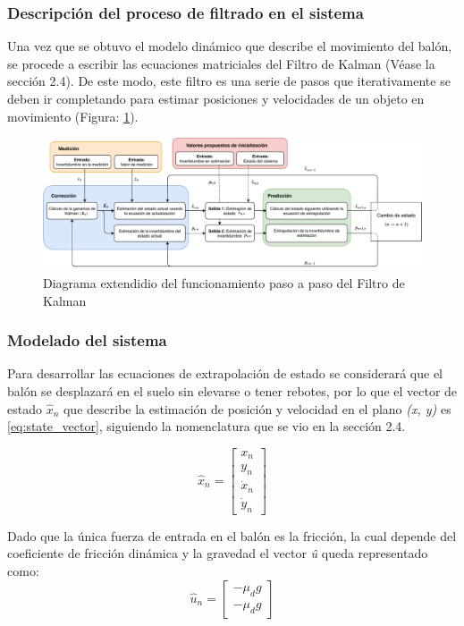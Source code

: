 		\subsubsection*{Descripción del proceso de filtrado en el sistema}
Una vez que se obtuvo el modelo dinámico que describe el movimiento del balón, se procede a escribir las ecuaciones matriciales del Filtro de Kalman (Véase la sección 2.4). De este modo, este filtro es una serie de pasos que iterativamente se deben ir completando para estimar posiciones y velocidades de un objeto en movimiento (Figura: \ref{fig:kalman_extended_diagram}).

\begin{figure}
\centering
\includegraphics[scale=0.6]{images/kalman_extended_diagram.pdf}
\caption{Diagrama extendidio del funcionamiento paso a paso del Filtro de Kalman}
\label{fig:kalman_extended_diagram}
\end{figure}

		\subsubsection*{Modelado del sistema}
Para desarrollar las ecuaciones de extrapolación de estado se considerará que el balón se desplazará en el suelo sin elevarse o tener rebotes, por lo que el vector de estado $\hat{x}_n$ que describe la estimación de posición y velocidad en el plano \textit{(x, y)} es \ref{eq:state_vector}, siguiendo la nomenclatura que se vio en la sección 2.4.

\begin{equation}
\hat{x}_n = \begin{bmatrix}
x_n\\ 
y_n\\ 
\dot{x}_n\\ 
\dot{y}_n
\end{bmatrix}
\label{eq:state_vector}
\end{equation}

Dado que la única fuerza de entrada en el balón es la fricción, la cual depende del coeficiente de fricción dinámica y la gravedad el vector \textit{û} queda representado como:
\begin{equation}
\hat{u}_n = \begin{bmatrix}
-\mu_d g\\
-\mu_d g
\end{bmatrix}
\label{eq:input_signal}
\end{equation}

